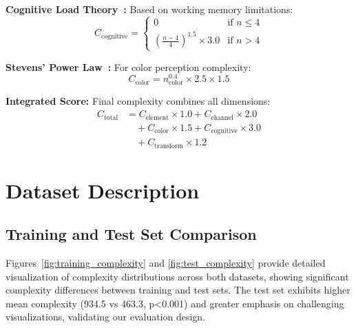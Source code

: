 \documentclass[journal]{IEEEtran}
\begin{document}
\textbf{Cognitive Load Theory~\cite{cowan2001}:} Based on working memory limitations:
\begin{equation}
C_{\text{cognitive}} = \begin{cases}
0 & \text{if } n \leq 4 \\
\left(\frac{n-4}{4}\right)^{1.5} \times 3.0 & \text{if } n > 4
\end{cases}
\end{equation}

\textbf{Stevens' Power Law~\cite{stevens1957}:} For color perception complexity:
\begin{equation}
C_{\text{color}} = n_{\text{color}}^{0.4} \times 2.5 \times 1.5
\end{equation}

\textbf{Integrated Score:} Final complexity combines all dimensions:
\begin{align}
C_{\text{total}} &= C_{\text{element}} \times 1.0 + C_{\text{channel}} \times 2.0 \nonumber \\
&\quad + C_{\text{color}} \times 1.5 + C_{\text{cognitive}} \times 3.0 \nonumber \\
&\quad + C_{\text{transform}} \times 1.2
\end{align}


\section{Dataset Description}

\subsection{Training and Test Set Comparison}

Figures~\ref{fig:training_complexity} and \ref{fig:test_complexity} provide detailed visualization of complexity distributions across both datasets, showing significant complexity differences between training and test sets. The test set exhibits higher mean complexity (934.5 vs 463.3, p<0.001) and greater emphasis on challenging visualizations, validating our evaluation design.
\end{document}
